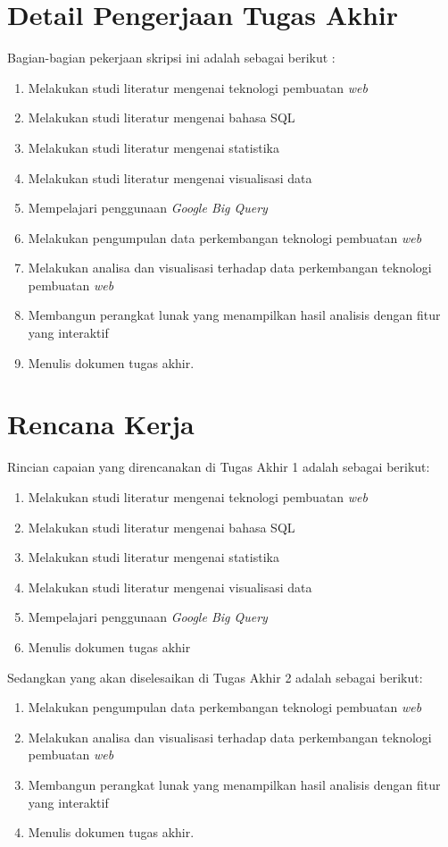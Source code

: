 \documentclass[a4paper,twoside]{article}
\newcommand{\web}{\textit{web}\xspace}
\begin{document}
	\section{Detail Pengerjaan Tugas Akhir}
	Bagian-bagian pekerjaan skripsi ini adalah sebagai berikut :
	\begin{enumerate}
		\item Melakukan studi literatur mengenai teknologi pembuatan \web
		\item Melakukan studi literatur mengenai bahasa SQL
            \item Melakukan studi literatur mengenai statistika
		\item Melakukan studi literatur mengenai visualisasi data
		\item Mempelajari penggunaan \textit{Google Big Query}
		\item Melakukan pengumpulan data perkembangan teknologi pembuatan \web
		\item Melakukan analisa dan visualisasi terhadap data perkembangan teknologi pembuatan \web
		\item Membangun perangkat lunak yang menampilkan hasil analisis dengan fitur yang interaktif 
		\item Menulis dokumen tugas akhir.
	\end{enumerate}
	
	\section{Rencana Kerja}
	Rincian capaian yang direncanakan di Tugas Akhir 1 adalah sebagai berikut:
	\begin{enumerate}
            \item Melakukan studi literatur mengenai teknologi pembuatan \web
		\item Melakukan studi literatur mengenai bahasa SQL
            \item Melakukan studi literatur mengenai statistika
		\item Melakukan studi literatur mengenai visualisasi data
		\item Mempelajari penggunaan \textit{Google Big Query}
            \item Menulis dokumen tugas akhir
	\end{enumerate}
	
	Sedangkan yang akan diselesaikan di Tugas Akhir 2 adalah sebagai berikut:
	\begin{enumerate}
            \item Melakukan pengumpulan data perkembangan teknologi pembuatan \web
		\item Melakukan analisa dan visualisasi terhadap data perkembangan teknologi pembuatan \web
		\item Membangun perangkat lunak yang menampilkan hasil analisis dengan fitur yang interaktif 
		\item Menulis dokumen tugas akhir.
	\end{enumerate}
	
\end{document}

